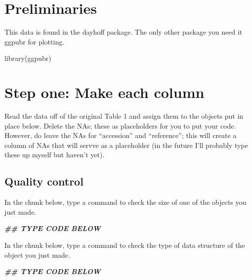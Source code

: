 \documentclass[
]{book}
\newenvironment{Shaded}{\begin{snugshade}}{\end{snugshade}}
\newcommand{\DocumentationTok}[1]{\textcolor[rgb]{0.56,0.35,0.01}{\textbf{\textit{#1}}}}
\newcommand{\FunctionTok}[1]{\textcolor[rgb]{0.00,0.00,0.00}{#1}}
\newcommand{\NormalTok}[1]{#1}
\begin{document}
\hypertarget{preliminaries-2}{%
\section{Preliminaries}\label{preliminaries-2}}

This data is found in the dayhoff package. The only other package you need it ggpubr for plotting.

\begin{Shaded}
\begin{Highlighting}[]
\FunctionTok{library}\NormalTok{(ggpubr)}
\end{Highlighting}
\end{Shaded}

\hypertarget{step-one-make-each-column-1}{%
\section{Step one: Make each column}\label{step-one-make-each-column-1}}

Read the data off of the original Table 1 and assign them to the objects put in place below. Delete the NAs; these as placeholders for you to put your code. However, do leave the NAs for ``accession'' and ``reference''; this will create a column of NAs that will servve as a placeholder (in the future I'll probably type these up myself but haven't yet).

\hypertarget{quality-control-1}{%
\subsection{Quality control}\label{quality-control-1}}

In the chunk below, type a command to check the size of one of the objects you just made.

\begin{Shaded}
\begin{Highlighting}[]
\DocumentationTok{\#\# TYPE CODE BELOW}
\end{Highlighting}
\end{Shaded}

In the chunk below, type a command to check the type of data structure of the object you just made.

\begin{Shaded}
\begin{Highlighting}[]
\DocumentationTok{\#\# TYPE CODE BELOW}
\end{Highlighting}
\end{Shaded}
\end{document}
